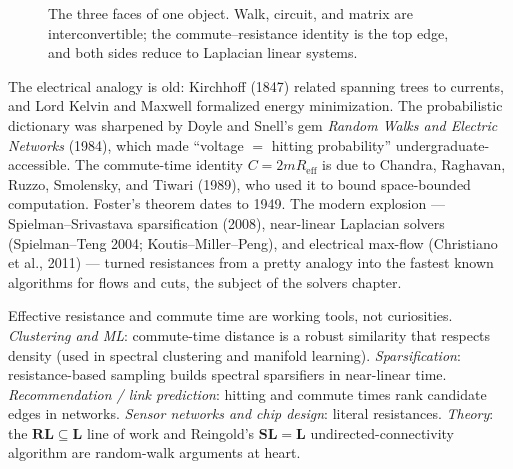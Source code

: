 \begin{figure}[H]
\centering
{}
\caption{The three faces of one object. Walk, circuit, and matrix are interconvertible; the commute--resistance identity is the top edge, and both sides reduce to Laplacian linear systems.}
\label{ch35:fig-triangle}
\end{figure}

\begin{historybox}
The electrical analogy is old: Kirchhoff (1847) related spanning trees to currents, and Lord Kelvin and Maxwell formalized energy minimization. The probabilistic dictionary was sharpened by Doyle and Snell's gem \emph{Random Walks and Electric Networks} (1984), which made ``voltage $=$ hitting probability'' undergraduate-accessible. The commute-time identity $C=2mR_{\mathrm{eff}}$ is due to Chandra, Raghavan, Ruzzo, Smolensky, and Tiwari (1989), who used it to bound space-bounded computation. Foster's theorem dates to 1949. The modern explosion --- Spielman--Srivastava sparsification (2008), near-linear Laplacian solvers (Spielman--Teng 2004; Koutis--Miller--Peng), and electrical max-flow (Christiano et al., 2011) --- turned resistances from a pretty analogy into the fastest known algorithms for flows and cuts, the subject of the solvers chapter.
\end{historybox}

\begin{applicationbox}
Effective resistance and commute time are working tools, not curiosities. \emph{Clustering and ML}: commute-time distance is a robust similarity that respects density (used in spectral clustering and manifold learning). \emph{Sparsification}: resistance-based sampling builds spectral sparsifiers in near-linear time. \emph{Recommendation / link prediction}: hitting and commute times rank candidate edges in networks. \emph{Sensor networks and chip design}: literal resistances. \emph{Theory}: the $\mathbf{RL}\subseteq\mathbf{L}$ line of work and Reingold's $\mathbf{SL}=\mathbf{L}$ undirected-connectivity algorithm are random-walk arguments at heart.
\end{applicationbox}

